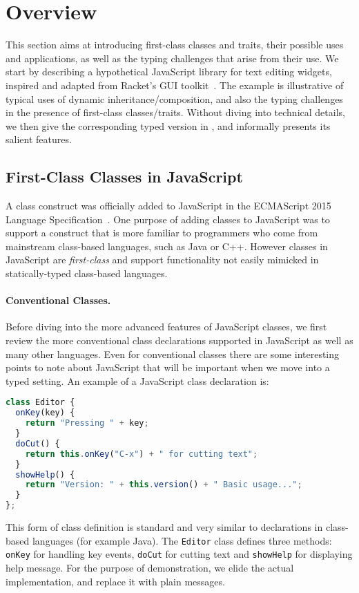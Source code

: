 
\section{Overview}
\label{sec:trait:overview}

This section aims at introducing first-class classes and traits, their possible
uses and applications, as well as the typing challenges that arise
from their use.
We start by describing a hypothetical JavaScript library for text editing
widgets, inspired and adapted from Racket's GUI
toolkit~\cite{DBLP:conf/oopsla/TakikawaSDTF12}. The example is illustrative of
typical uses of dynamic inheritance/composition, and also the typing challenges
in the presence of first-class classes/traits. Without diving into
technical details, we then give the corresponding typed version in
\sedel, and informally presents its salient features.

\subsection{First-Class Classes in JavaScript}

A class construct was officially added to JavaScript in the ECMAScript
2015 Language Specification~\cite{EcmaScript:15}. One purpose of
adding classes to JavaScript was to support a construct that is more
familiar to programmers who come from mainstream class-based languages,
such as Java or C++. However classes in JavaScript are
\emph{first-class} and support functionality not easily mimicked in
statically-typed class-based languages.

\paragraph{Conventional Classes.}

Before diving into the more advanced features of JavaScript classes, we first
review the more conventional class declarations supported in JavaScript as well
as many other languages. Even for conventional classes there are some
interesting points to note about JavaScript that will be important when we move
into a typed setting. An example of a JavaScript class declaration is:
\begin{lstlisting}[language=JavaScript]
class Editor {
  onKey(key) {
    return "Pressing " + key;
  }
  doCut() {
    return this.onKey("C-x") + " for cutting text";
  }
  showHelp() {
    return "Version: " + this.version() + " Basic usage...";
  }
};
\end{lstlisting}
This form of class definition is standard and very similar to declarations in
class-based languages (for example Java). The \lstinline{Editor} class
defines three methods: \lstinline{onKey} for handling key events,
\lstinline{doCut} for cutting text and \lstinline{showHelp} for displaying help
message. For the purpose of demonstration, we elide the actual implementation,
and replace it with plain messages.

